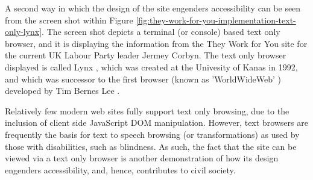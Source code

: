 A second way in which the design of the site engenders accessibility can be seen from the screen shot within Figure \ref{fig:they-work-for-you-implementation-text-only-lynx}.
The screen shot depicts a terminal (or console) based text only browser, and it is displaying the information from the They Work for You site for the current UK Labour Party leader Jermey Corbyn.
The text only browser displayed is called Lynx \cite{lynx}, which was created at the Univesity of Kanas in 1992, and which was successor to the first browser (known as 'WorldWideWeb' \cite{browser-history}) developed by Tim Bernes Lee \cite{tim-berners-lee}.

Relatively few modern web sites fully support text only browsing, due to the inclusion of client side JavaScript DOM manipulation.
However, text browsers are frequently the basis for text to speech browsing (or transformations) as used by those with disabilities, such as blindness.
As such, the fact that the site can be viewed via a text only browser is another demonstration of how its design engenders accessibility, and, hence, contributes to civil society.
